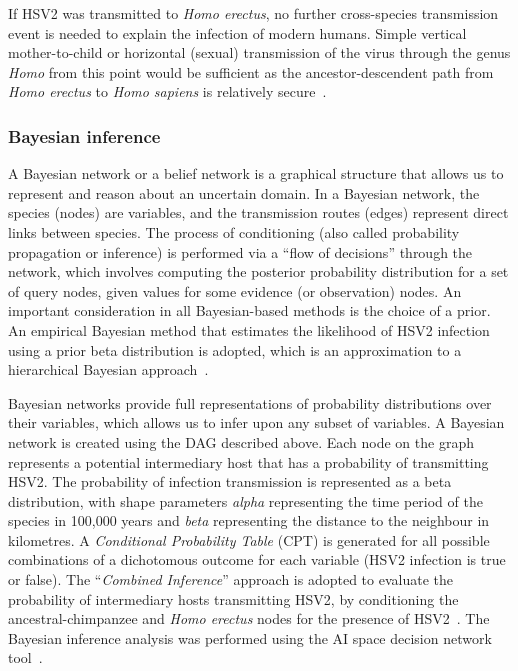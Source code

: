\documentclass[fleqn,10pt]{wlscirep}
\begin{document}
If HSV2 was transmitted to \textit{Homo erectus}, no further cross-species transmission event is needed to explain the infection of modern humans. Simple vertical mother-to-child or horizontal (sexual) transmission of the virus through the genus \textit{Homo} from this point would be sufficient as the ancestor-descendent path from \textit{Homo erectus} to \textit{Homo sapiens} is relatively secure~\citep{Maslin2015}.

\subsubsection*{Bayesian inference}
A Bayesian network or a belief network is a graphical structure that allows us to represent and reason about an uncertain domain. In a Bayesian network, the species (nodes) are variables, and the transmission routes (edges) represent direct links between species. The process of conditioning (also called probability propagation or inference) is performed via a ``flow of decisions'' through the network, which involves computing the posterior probability distribution for a set of query nodes, given values for some evidence (or observation) nodes. An important consideration in all Bayesian-based methods is the choice of a prior. An empirical Bayesian method that estimates the likelihood of HSV2 infection using a prior beta distribution is adopted, which is an approximation to a hierarchical Bayesian approach~\citep{Farine2015,Murphy2012}.
 
Bayesian networks provide full representations of probability distributions over their variables, which allows us to infer upon any subset of variables. A Bayesian network is created using the DAG described above. Each node on the graph represents a potential intermediary host that has a probability of transmitting HSV2. The probability of infection transmission is represented as a beta distribution, with shape parameters \textit{alpha} representing the time period of the species in 100,000 years and \textit{beta} representing the distance to the neighbour in kilometres. A \textit{Conditional Probability Table} (CPT) is generated for all possible combinations of a dichotomous outcome for each variable (HSV2 infection is true or false). The ``\textit{Combined Inference}'' approach is adopted to evaluate the probability of intermediary hosts transmitting HSV2, by conditioning the ancestral-chimpanzee and \textit{Homo erectus} nodes for the presence of HSV2~\citep{Korb2003}. The Bayesian inference analysis was performed using the AI space decision network tool~\citep{poole2010artificial}.
\end{document}
